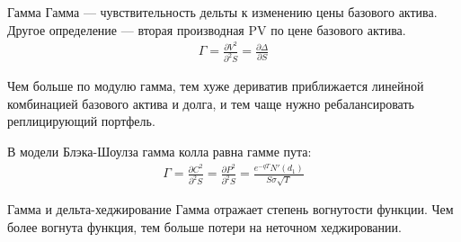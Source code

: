 \documentclass{beamer}
\begin{document}
\begin{frame}{Гамма}
\justify
Гамма --- чувствительность дельты к изменению цены базового актива. Другое определение --- вторая производная PV по цене базового актива.
\begin{align*}
\Gamma = \frac{\partial V^2}{\partial^2 S} = \frac{\partial \Delta}{\partial S}
\end{align*}

\justify
Чем больше по модулю гамма, тем хуже дериватив приближается линейной комбинацией базового актива и долга, и тем чаще нужно ребалансировать реплицирующий портфель.

\justify
В модели Блэка-Шоулза гамма колла равна гамме пута:
\begin{align*}
\Gamma = \frac{\partial C^2}{\partial^2 S} = \frac{\partial P^2}{\partial^2 S} =
\frac{e^{-qT}N'(d_1)}{S\sigma\sqrt{T}} 
\end{align*} 
\end{frame}



\begin{frame}{Гамма и дельта-хеджирование}
\justify
Гамма отражает степень вогнутости функции. Чем более вогнута функция, тем больше потери на неточном хеджировании.

\centering
{}
\end{frame}
\end{document}
